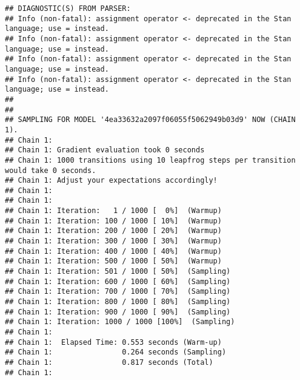 \documentclass[]{article}
\newenvironment{Shaded}{\begin{snugshade}}{\end{snugshade}}
\newcommand{\KeywordTok}[1]{\textcolor[rgb]{0.13,0.29,0.53}{\textbf{#1}}}
\newcommand{\DataTypeTok}[1]{\textcolor[rgb]{0.13,0.29,0.53}{#1}}
\newcommand{\DecValTok}[1]{\textcolor[rgb]{0.00,0.00,0.81}{#1}}
\newcommand{\StringTok}[1]{\textcolor[rgb]{0.31,0.60,0.02}{#1}}
\newcommand{\OperatorTok}[1]{\textcolor[rgb]{0.81,0.36,0.00}{\textbf{#1}}}
\newcommand{\NormalTok}[1]{#1}
\begin{document}
\begin{verbatim}
## DIAGNOSTIC(S) FROM PARSER:
## Info (non-fatal): assignment operator <- deprecated in the Stan language; use = instead.
## Info (non-fatal): assignment operator <- deprecated in the Stan language; use = instead.
## Info (non-fatal): assignment operator <- deprecated in the Stan language; use = instead.
## Info (non-fatal): assignment operator <- deprecated in the Stan language; use = instead.
## 
## 
## SAMPLING FOR MODEL '4ea33632a2097f06055f5062949b03d9' NOW (CHAIN 1).
## Chain 1: 
## Chain 1: Gradient evaluation took 0 seconds
## Chain 1: 1000 transitions using 10 leapfrog steps per transition would take 0 seconds.
## Chain 1: Adjust your expectations accordingly!
## Chain 1: 
## Chain 1: 
## Chain 1: Iteration:   1 / 1000 [  0%]  (Warmup)
## Chain 1: Iteration: 100 / 1000 [ 10%]  (Warmup)
## Chain 1: Iteration: 200 / 1000 [ 20%]  (Warmup)
## Chain 1: Iteration: 300 / 1000 [ 30%]  (Warmup)
## Chain 1: Iteration: 400 / 1000 [ 40%]  (Warmup)
## Chain 1: Iteration: 500 / 1000 [ 50%]  (Warmup)
## Chain 1: Iteration: 501 / 1000 [ 50%]  (Sampling)
## Chain 1: Iteration: 600 / 1000 [ 60%]  (Sampling)
## Chain 1: Iteration: 700 / 1000 [ 70%]  (Sampling)
## Chain 1: Iteration: 800 / 1000 [ 80%]  (Sampling)
## Chain 1: Iteration: 900 / 1000 [ 90%]  (Sampling)
## Chain 1: Iteration: 1000 / 1000 [100%]  (Sampling)
## Chain 1: 
## Chain 1:  Elapsed Time: 0.553 seconds (Warm-up)
## Chain 1:                0.264 seconds (Sampling)
## Chain 1:                0.817 seconds (Total)
## Chain 1:
\end{verbatim}

\begin{Shaded}
\end{Shaded}
\end{document}
